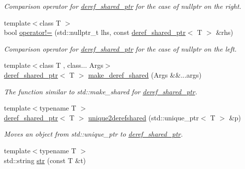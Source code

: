 \begin{DoxyCompactItemize}
\begin{DoxyCompactList}\small\item\em Comparison operator for \hyperlink{classslb_1_1core_1_1util_1_1deref__shared__ptr}{deref\+\_\+shared\+\_\+ptr} for the case of {\ttfamily nullptr} on the right. \end{DoxyCompactList}\item 
{\footnotesize template$<$class T $>$ }\\bool \hyperlink{namespaceslb_1_1core_1_1util_a62443a5539cf3e36e67a7343806b65a3}{operator!=} (std\+::nullptr\+\_\+t lhs, const \hyperlink{classslb_1_1core_1_1util_1_1deref__shared__ptr}{deref\+\_\+shared\+\_\+ptr}$<$ T $>$ \&rhs)
\begin{DoxyCompactList}\small\item\em Comparison operator for \hyperlink{classslb_1_1core_1_1util_1_1deref__shared__ptr}{deref\+\_\+shared\+\_\+ptr} for the case of {\ttfamily nullptr} on the left. \end{DoxyCompactList}\item 
{\footnotesize template$<$class T , class... Args$>$ }\\\hyperlink{classslb_1_1core_1_1util_1_1deref__shared__ptr}{deref\+\_\+shared\+\_\+ptr}$<$ T $>$ \hyperlink{namespaceslb_1_1core_1_1util_a1d307411caad59a01d41cbb34ea71d8c}{make\+\_\+deref\+\_\+shared} (Args \&\&...args)
\begin{DoxyCompactList}\small\item\em The function similar to {\ttfamily std\+::make\+\_\+shared} for \hyperlink{classslb_1_1core_1_1util_1_1deref__shared__ptr}{deref\+\_\+shared\+\_\+ptr}. \end{DoxyCompactList}\item 
{\footnotesize template$<$typename T $>$ }\\\hyperlink{classslb_1_1core_1_1util_1_1deref__shared__ptr}{deref\+\_\+shared\+\_\+ptr}$<$ T $>$ \hyperlink{namespaceslb_1_1core_1_1util_acb7cbe60d3098ca39a993fb6a5640a2f}{unique2derefshared} (std\+::unique\+\_\+ptr$<$ T $>$ \&p)
\begin{DoxyCompactList}\small\item\em Moves an object from {\ttfamily std\+::unique\+\_\+ptr} to \hyperlink{classslb_1_1core_1_1util_1_1deref__shared__ptr}{deref\+\_\+shared\+\_\+ptr}. \end{DoxyCompactList}\item 
{\footnotesize template$<$typename T $>$ }\\std\+::string \hyperlink{namespaceslb_1_1core_1_1util_a2e7207fe123391c539ef9924d347f7e1}{str} (const T \&t)

\end{DoxyCompactItemize}
